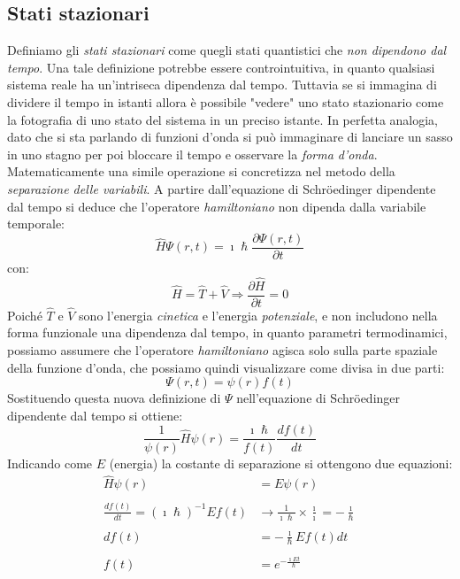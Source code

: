 \documentclass[oneside]{amsbook}
\numberwithin{section}{chapter}
\numberwithin{equation}{section}
\numberwithin{figure}{section}
\begin{document}
\subsection{Stati stazionari}
Definiamo gli \emph{stati stazionari}  come quegli stati quantistici che \emph{non dipendono dal tempo}. Una tale definizione potrebbe essere controintuitiva, in quanto qualsiasi sistema reale ha un'intriseca dipendenza dal tempo. Tuttavia se si immagina di dividere il tempo in istanti allora è possibile "vedere" uno stato stazionario come la fotografia di uno stato del sistema in un preciso istante. In perfetta analogia, dato che si sta parlando di funzioni d'onda si può immaginare di lanciare un sasso in uno stagno per poi bloccare il tempo e osservare la \emph{forma d'onda}. Matematicamente una simile operazione si concretizza nel metodo della \emph{separazione delle variabili}.
A partire dall'equazione di Schr\"oedinger dipendente dal tempo si deduce che l'operatore \emph{hamiltoniano} non dipenda dalla variabile temporale:
\begin{equation}
\hat{H}\Psi(r,t)= \imath\hslash\frac{\partial\Psi(r,t)}{\partial t}
\end{equation}
con:
\begin{equation}
\hat{H}=\hat{T}+\hat{V} \Rightarrow \frac{\partial\hat{H}}{\partial t	}=0
\end{equation}
Poiché $\hat{T}$ e $\hat{V}$ sono l'energia \emph{cinetica} e l'energia \emph{potenziale}, e non includono nella forma funzionale una dipendenza dal tempo, in quanto parametri termodinamici, possiamo assumere che l'operatore \emph{hamiltoniano }agisca solo sulla parte spaziale della funzione d'onda, che possiamo quindi visualizzare come divisa in due parti:
\begin{equation}
\Psi(r,t)=\psi(r)f(t)
\end{equation}
Sostituendo questa nuova definizione di $\Psi$ nell'equazione di Schr\"oedinger dipendente dal tempo si ottiene:
\begin{equation}
\frac{1}{\psi(r)}\hat{H}\psi(r)=\frac{\imath \hslash}{f(t)}\frac{df(t)}{dt}
\end{equation}
Indicando come $E$ (energia) la costante di separazione si ottengono due equazioni:
\begin{equation}
\begin{aligned}
\hat{H}\psi(r)&=E\psi(r) \\ \\
\frac{df(t)}{dt} = (\imath \hslash)^{-1}Ef(t) &\rightarrow \frac{1}{\imath \hslash}\times\frac{\imath}{\imath}=-\frac{\imath}{\hslash} \\ \\
df(t) &= -\frac{\imath}{\hslash} Ef(t)dt \\ \\
f(t) &= e^{-\frac{\imath E t}{\hslash}}
\end{aligned}
\end{equation}
\end{document}
